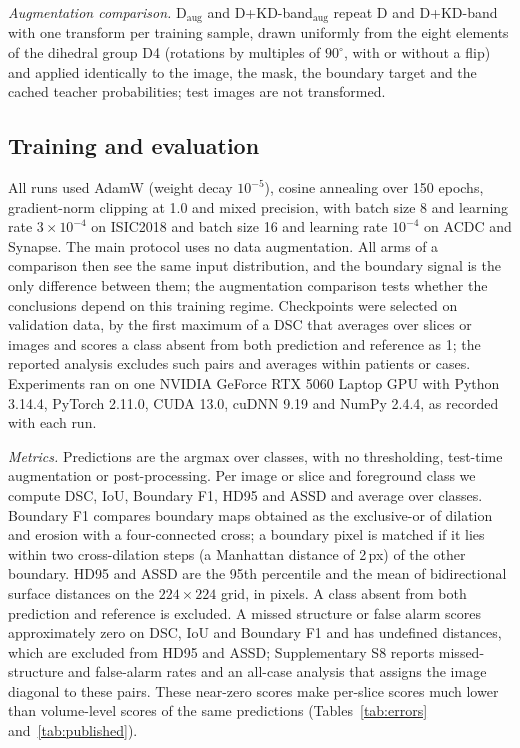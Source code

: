 \documentclass[fleqn,10pt,lineno]{wlpeerj}
\begin{document}
\emph{Augmentation comparison.} D$_{\mathrm{aug}}$ and D+KD-band$_{\mathrm{aug}}$ repeat D and D+KD-band with one transform per training sample, drawn uniformly from the eight elements of the dihedral group D4 (rotations by multiples of $90^{\circ}$, with or without a flip) and applied identically to the image, the mask, the boundary target and the cached teacher probabilities; test images are not transformed.

\subsection*{Training and evaluation}
All runs used AdamW (weight decay $10^{-5}$), cosine annealing over 150 epochs, gradient-norm clipping at 1.0 and mixed precision, with batch size 8 and learning rate $3\times10^{-4}$ on ISIC2018 and batch size 16 and learning rate $10^{-4}$ on ACDC and Synapse. The main protocol uses no data augmentation. All arms of a comparison then see the same input distribution, and the boundary signal is the only difference between them; the augmentation comparison tests whether the conclusions depend on this training regime. Checkpoints were selected on validation data, by the first maximum of a DSC that averages over slices or images and scores a class absent from both prediction and reference as 1; the reported analysis excludes such pairs and averages within patients or cases. Experiments ran on one NVIDIA GeForce RTX 5060 Laptop GPU with Python 3.14.4, PyTorch 2.11.0, CUDA 13.0, cuDNN 9.19 and NumPy 2.4.4, as recorded with each run.

\emph{Metrics.} Predictions are the argmax over classes, with no thresholding, test-time augmentation or post-processing. Per image or slice and foreground class we compute DSC, IoU, Boundary F1, HD95 and ASSD and average over classes. Boundary F1 compares boundary maps obtained as the exclusive-or of dilation and erosion with a four-connected cross; a boundary pixel is matched if it lies within two cross-dilation steps (a Manhattan distance of 2\,px) of the other boundary. HD95 and ASSD are the 95th percentile and the mean of bidirectional surface distances on the $224\times224$ grid, in pixels. A class absent from both prediction and reference is excluded. A missed structure or false alarm scores approximately zero on DSC, IoU and Boundary F1 and has undefined distances, which are excluded from HD95 and ASSD; Supplementary S8 reports missed-structure and false-alarm rates and an all-case analysis that assigns the image diagonal to these pairs. These near-zero scores make per-slice scores much lower than volume-level scores of the same predictions (Tables~\ref{tab:errors} and~\ref{tab:published}).
\end{document}
